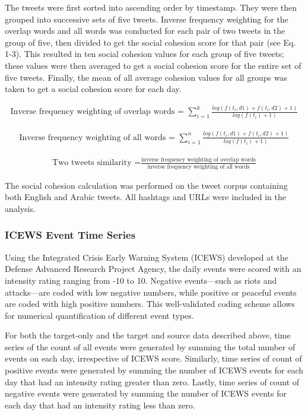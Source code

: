 \documentclass[english,man]{apa6}
\begin{document}
The tweets were first sorted into ascending order by timestamp. They were
then grouped into successive sets of five tweets. Inverse frequency
weighting for the overlap words and all words was conducted for each pair
of two tweets in the group of five, then divided to get the social cohesion
score for that pair (see Eq. 1-3). This resulted in ten social cohesion
values for each group of five tweets; these values were then averaged to get
a social cohesion score for the entire set of five tweets. Finally,
the mean of all average cohesion values for all groups was taken to get
a social cohesion score for each day.

\begin{align}
\text{Inverse frequency weighting of overlap words = }\sum_{i=1}^k \frac{log(f(t_i, d1) + f(t_i, d2) + 1)}{log(f(t_i) + 1)}
\end{align}

\begin{align}
\text{Inverse frequency weighting of all words = }\sum_{i=1}^n \frac{log(f(t_i, d1) + f(t_i, d2) + 1)}{log(f(t_i) + 1)}
\end{align}

\begin{align}
\text{Two tweets similarity =}\frac{\text{inverse frequency weighting of overlap words}}{\text{inverse frequency weighting of all words}}
\end{align}

The social cohesion calculation was performed on the tweet corpus
containing both English and Arabic tweets. All hashtags and URLs were included
in the analysis.

\hypertarget{icews-event-time-series}{%
\subsubsection{ICEWS Event Time Series}\label{icews-event-time-series}}

Using the Integrated Crisis Early Warning System (ICEWS) developed at the
Defense Advanced Research Project Agency, the daily events were
scored with an intensity rating ranging from -10 to 10. Negative
events---such as riots and attacks---are coded with low negative numbers, while
positive or peaceful events are coded with high positive numbers. This
well-validated coding scheme allows for numerical quantification of
different event types.

For both the target-only and the target and source data described above, time series of
the count of all events were generated by summing the total number of events
on each day, irrespective of ICEWS score. Similarly, time series of count
of positive events were generated by summing the number of ICEWS events
for each day that had an intensity rating greater than zero. Lastly,
time series of count of negative events were generated by summing the number
of ICEWS events for each day that had an intensity rating less than zero.
\end{document}
